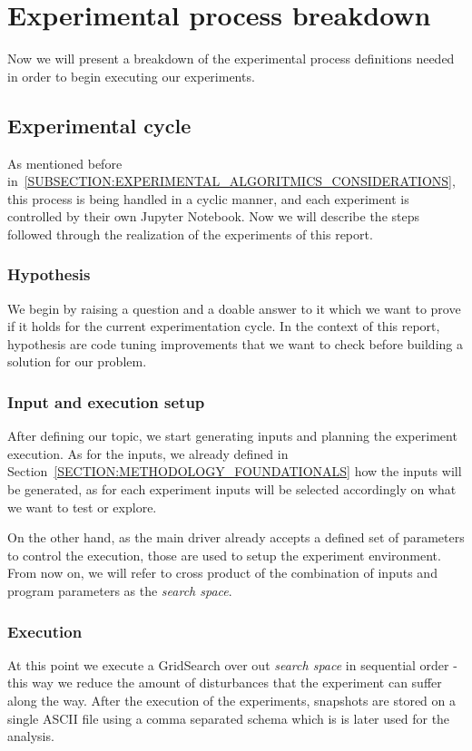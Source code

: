 \section{Experimental process breakdown}
Now we will present a breakdown of the experimental process definitions needed in order to begin executing our experiments.

\subsection{Experimental cycle}
As mentioned before in~\ref{SUBSECTION:EXPERIMENTAL_ALGORITMICS_CONSIDERATIONS}, this process is being handled in a cyclic manner, and each experiment is controlled by their own Jupyter Notebook. Now we will describe the steps followed through the realization of the experiments of this report.

\subsubsection{Hypothesis}
We begin by raising a question and a doable answer to it which we want to prove if it holds for the current experimentation cycle. In the context of this report, hypothesis are code tuning improvements that we want to check before building a solution for our problem.

\subsubsection{Input and execution setup}
After defining our topic, we start generating inputs and planning the experiment execution. As for the inputs, we already defined in Section~\ref{SECTION:METHODOLOGY_FOUNDATIONALS} how the inputs will be generated, as for each experiment inputs will be selected accordingly on what we want to test or explore. 

On the other hand, as the main driver already accepts a defined set of parameters to control the execution, those are used to setup the experiment environment. From now on, we will refer to cross product of the combination of inputs and program parameters as the \textit{search space}.

\subsubsection{Execution}
At this point we execute a GridSearch over out \textit{search space} in sequential order - this way we reduce the amount of disturbances that the experiment can suffer along the way. After the execution of the experiments, snapshots are stored on a single ASCII file using a comma separated schema which is is later used for the analysis.

